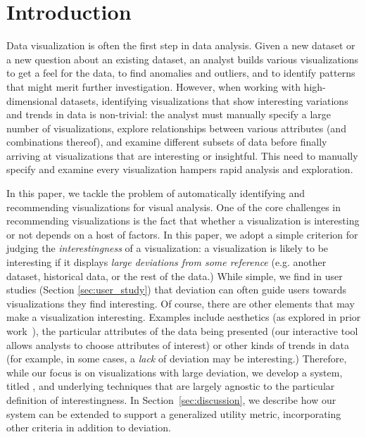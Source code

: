 
\section{Introduction}
\label{sec:introduction}
Data visualization is often the first step in data analysis.
Given a new dataset or a new question about an existing dataset, an analyst builds
various visualizations to get a feel for the data, to find anomalies and outliers, 
and to identify patterns that might merit further investigation.
However, when working with high-dimensional datasets, identifying visualizations that
show interesting variations and trends in data is non-trivial:
the analyst must manually specify a large number of visualizations, explore relationships between various
attributes (and combinations thereof), and examine different subsets of data before finally 
arriving at visualizations that are interesting or insightful.
This need to manually specify and examine every visualization hampers rapid analysis 
and exploration.


In this paper, we tackle the problem of automatically 
identifying and recommending 
visualizations for visual analysis.  
One of the core challenges in recommending visualizations is the fact that 
whether a visualization is interesting or not
depends on a host of factors.
In this paper, we adopt a simple criterion for judging the {\em interestingness} of a visualization: 
a visualization is likely to be interesting if it displays 
{\em large deviations from some
reference} (e.g. another dataset, historical data, or the rest of the data.)
While simple, we find in user studies (Section \ref{sec:user_study}) 
that deviation can often guide users towards visualizations they find interesting.
Of course, there are other elements that may make a visualization interesting.
Examples include aesthetics (as explored in prior work~\cite{polaris,Mackinlay:1986:ADG:22949.22950}), 
the particular attributes of the data being presented 
(our interactive tool allows analysts to choose attributes of interest) 
or other kinds of trends in
data (for example, in some cases, a {\it lack} of deviation may be interesting.)  
Therefore, while our focus is on visualizations with large deviation, 
we develop a system, titled \SeeDB, 
and underlying techniques that are largely agnostic to the
particular definition of interestingness.
In Section~\ref{sec:discussion}, we describe how our system can be
extended to support a generalized utility metric, incorporating
other criteria in addition to deviation. 

